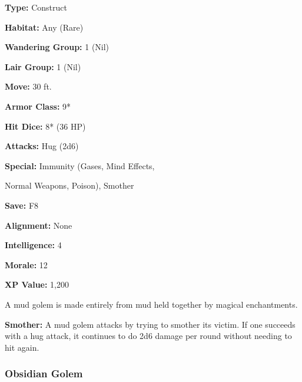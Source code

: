 \begin{multicols*}{2}
{\textbf{Type:} Construct

\textbf{Habitat:} Any (Rare)

\textbf{Wandering Group:} 1 (Nil)

\textbf{Lair Group:} 1 (Nil)

\textbf{Move:} 30 ft.

\textbf{Armor Class:} 9*

\textbf{Hit Dice:} 8* (36 HP)

\textbf{Attacks:} Hug (2d6)

\textbf{Special:} Immunity (Gases, Mind Effects, 

Normal Weapons, Poison), Smother

\textbf{Save:} F8

\textbf{Alignment:} None

\textbf{Intelligence:} 4

\textbf{Morale:} 12

\textbf{XP Value:} 1,200}

A mud golem is made entirely from mud held together by magical enchantments.

\textbf{Smother:} A mud golem attacks by trying to smother its victim. If one succeeds with a hug attack, it continues to do 2d6 damage per round without needing to hit again.

\subsubsection{Obsidian Golem}
\end{multicols*}
